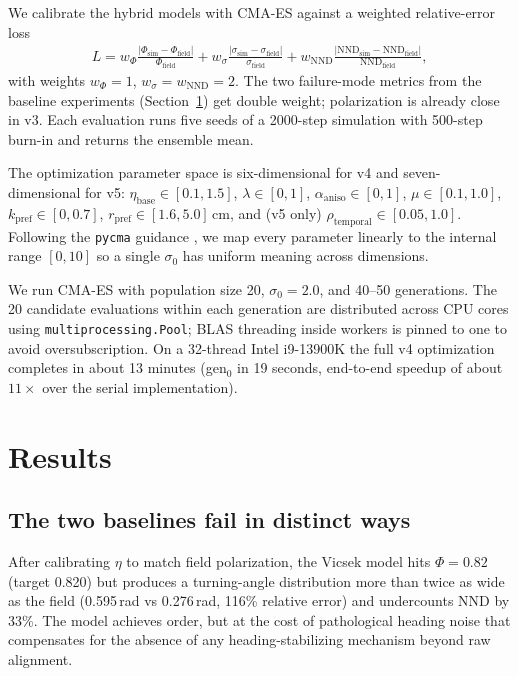 \documentclass[11pt]{article}
\begin{document}
We calibrate the hybrid models with CMA-ES against a weighted relative-error
loss
\begin{align}
L = w_\Phi \frac{|\Phi_\text{sim} - \Phi_\text{field}|}{\Phi_\text{field}}
  + w_\sigma \frac{|\sigma_\text{sim} - \sigma_\text{field}|}{\sigma_\text{field}}
  + w_\text{NND} \frac{|\text{NND}_\text{sim} - \text{NND}_\text{field}|}{\text{NND}_\text{field}},
\end{align}
with weights $w_\Phi = 1$, $w_\sigma = w_\text{NND} = 2$. The two
failure-mode metrics from the baseline experiments (Section~\ref{sec:results})
get double weight; polarization is already close in v3. Each evaluation
runs five seeds of a 2000-step simulation with 500-step burn-in and
returns the ensemble mean.

The optimization parameter space is six-dimensional for v4 and
seven-dimensional for v5: $\eta_\text{base} \in [0.1, 1.5]$,
$\lambda \in [0, 1]$, $\alpha_\text{aniso} \in [0, 1]$,
$\mu \in [0.1, 1.0]$, $k_\text{pref} \in [0, 0.7]$,
$r_\text{pref} \in [1.6, 5.0]$\,cm, and (v5 only)
$\rho_\text{temporal} \in [0.05, 1.0]$. Following the \texttt{pycma}
guidance \citep{pycma}, we map every parameter linearly to the internal
range $[0, 10]$ so a single $\sigma_0$ has uniform meaning across
dimensions.

We run CMA-ES with population size 20, $\sigma_0 = 2.0$, and 40--50
generations. The 20 candidate evaluations within each generation are
distributed across CPU cores using \texttt{multiprocessing.Pool}; BLAS
threading inside workers is pinned to one to avoid oversubscription. On
a 32-thread Intel i9-13900K the full v4 optimization completes in
about 13 minutes (gen$_0$ in 19 seconds, end-to-end speedup of about
$11{\times}$ over the serial implementation).

\section{Results}
\label{sec:results}

\subsection{The two baselines fail in distinct ways}

After calibrating $\eta$ to match field polarization, the Vicsek model
hits $\Phi = 0.82$ (target 0.820) but produces a turning-angle
distribution more than twice as wide as the field
(0.595\,rad vs 0.276\,rad, 116\% relative error) and undercounts NND by
33\%. The model achieves order, but at the cost of pathological
heading noise that compensates for the absence of any heading-stabilizing
mechanism beyond raw alignment.
\end{document}
